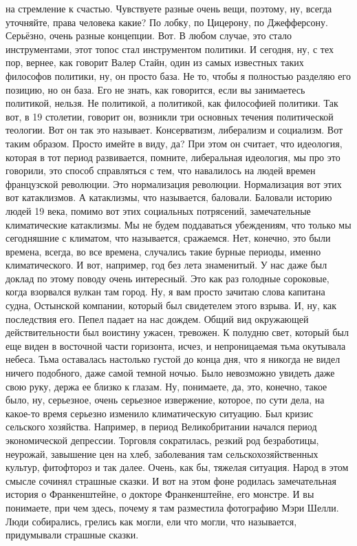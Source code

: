 на стремление к счастью. Чувствуете разные очень вещи, поэтому, ну, всегда
уточняйте, права человека какие? По лобку, по Цицерону, по Джефферсону.
Серьёзно, очень разные концепции. Вот. В любом случае, это стало инструментами,
этот топос стал инструментом политики. И сегодня, ну, с тех пор, вернее, как
говорит Валер Стайн, один из самых известных таких философов политики, ну, он
просто база. Не то, чтобы я полностью разделяю его позицию, но он база. Его не
знать, как говорится, если вы занимаетесь политикой, нельзя. Не политикой, а
политикой, как философией политики. Так вот, в 19 столетии, говорит он, возникли
три основных течения политической теологии. Вот он так это называет.
Консерватизм, либерализм и социализм. Вот таким образом. Просто имейте в виду,
да? При этом он считает, что идеология, которая в тот период развивается,
помните, либеральная идеология, мы про это говорили, это способ справляться с
тем, что навалилось на людей времен французской революции. Это нормализация
революции. Нормализация вот этих вот катаклизмов. А катаклизмы, что называется,
баловали. Баловали историю людей 19 века, помимо вот этих социальных потрясений,
замечательные климатические катаклизмы. Мы не будем поддаваться убеждениям, что
только мы сегодняшние с климатом, что называется, сражаемся. Нет, конечно, это
были времена, всегда, во все времена, случались такие бурные периоды, именно
климатического. И вот, например, год без лета знаменитый. У нас даже был доклад
по этому поводу очень интересный. Это как раз голодные сороковые, когда
взорвался вулкан там город. Ну, я вам просто зачитаю слова капитана судна,
Остынской компании, который был свидетелем этого взрыва. И, ну, как последствия
его. Пепел падает на нас дождем. Общий вид окружающей действительности был
воистину ужасен, тревожен. К полудню свет, который был еще виден в восточной
части горизонта, исчез, и непроницаемая тьма окутывала небеса. Тьма оставалась
настолько густой до конца дня, что я никогда не видел ничего подобного, даже
самой темной ночью. Было невозможно увидеть даже свою руку, держа ее близко к
глазам. Ну, понимаете, да, это, конечно, такое было, ну, серьезное, очень
серьезное извержение, которое, по сути дела, на какое-то время серьезно изменило
климатическую ситуацию. Был кризис сельского хозяйства. Например, в период
Великобритании начался период экономической депрессии. Торговля сократилась,
резкий род безработицы, неурожай, завышение цен на хлеб, заболевания там
сельскохозяйственных культур, фитофтороз и так далее. Очень, как бы, тяжелая
ситуация. Народ в этом смысле сочинял страшные сказки. И вот на этом фоне
родилась замечательная история о Франкенштейне, о докторе Франкенштейне, его
монстре. И вы понимаете, при чем здесь, почему я там разместила фотографию Мэри
Шелли. Люди собирались, грелись как могли, ели что могли, что называется,
придумывали страшные сказки. 

